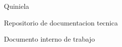 \begin{titlepage}
\centering
{\sffamily\Large Quiniela\par}
\vspace{0.5cm}
{\sffamily\large Repositorio de documentacion tecnica\par}
\vspace{1.5cm}
{\Huge\bfseries \doctitle\par}
\vspace{0.8cm}
{\Large \docarea\par}
\vfill
\begin{tcolorbox}[width=0.8\textwidth,colback=quinielaLight,colframe=quinielaBlue]
\centering
{}
\end{tcolorbox}
\vfill
{\sffamily Documento interno de trabajo\par}
\end{titlepage}

